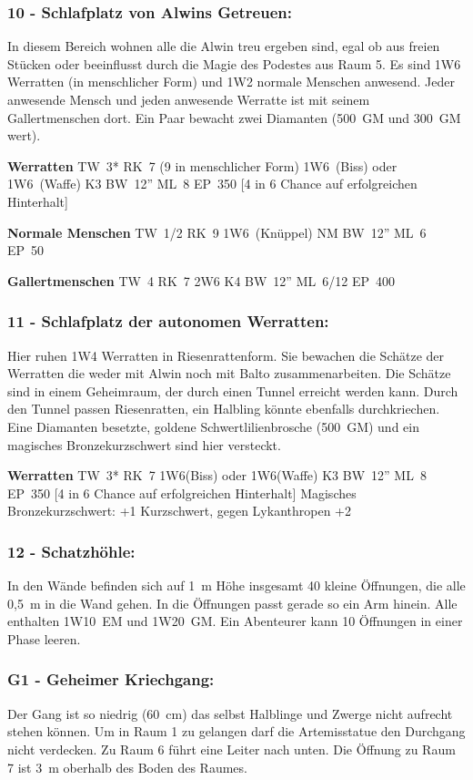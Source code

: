 \subsubsection{10 - Schlafplatz von Alwins Getreuen:} In diesem Bereich wohnen alle die
Alwin treu ergeben sind, egal ob aus freien Stücken oder beeinflusst
durch die Magie des Podestes aus Raum 5. Es sind 1W6 Werratten (in
menschlicher Form) und 1W2 normale Menschen anwesend. Jeder anwesende
Mensch und jeden anwesende Werratte ist mit seinem Gallertmenschen dort.
Ein Paar bewacht zwei Diamanten (500~GM und 300~GM wert).  

\textbf{Werratten} TW~3* RK~7 (9 in menschlicher Form) 1W6~(Biss) oder 1W6~(Waffe)
K3 BW~12'' ML~8 EP~350 [4 in 6 Chance auf erfolgreichen Hinterhalt] 

\textbf{Normale Menschen} TW~1/2 RK~9 1W6~(Knüppel) NM BW~12'' ML~6 EP~50 

\textbf{Gallertmenschen} TW~4 RK~7 2W6 K4 BW~12'' ML~6/12 EP~400

\subsubsection{11 - Schlafplatz der autonomen Werratten:} Hier ruhen 1W4 Werratten in
Riesenrattenform. Sie bewachen die Schätze der Werratten die weder
mit Alwin noch mit Balto zusammenarbeiten. Die Schätze sind in einem
Geheimraum, der durch einen Tunnel erreicht werden kann. Durch den Tunnel
passen Riesenratten, ein Halbling könnte ebenfalls durchkriechen. Eine
Diamanten besetzte, goldene Schwertlilienbrosche (500~GM) und ein
magisches Bronzekurzschwert sind hier versteckt.  

\textbf{Werratten} TW~3* RK~7 1W6(Biss) oder 1W6(Waffe) K3 BW~12'' ML~8 EP~350 [4 in 6 Chance auf
erfolgreichen Hinterhalt] Magisches Bronzekurzschwert: +1 Kurzschwert,
gegen Lykanthropen +2

\subsubsection{12 - Schatzhöhle:} In den Wände befinden sich auf 1~m Höhe insgesamt 40
kleine Öffnungen, die alle 0,5~m in die Wand gehen. In die Öffnungen
passt gerade so ein Arm hinein. Alle enthalten 1W10~EM und 1W20~GM. Ein
Abenteurer kann 10 Öffnungen in einer Phase leeren.

\subsubsection{G1 - Geheimer Kriechgang:} Der Gang ist so niedrig (60~cm) das selbst
Halblinge und Zwerge nicht aufrecht stehen können. Um in Raum 1 zu
gelangen darf die Artemisstatue den Durchgang nicht verdecken. Zu Raum
6 führt eine Leiter nach unten. Die Öffnung zu Raum 7 ist 3~m oberhalb
des Boden des Raumes.

